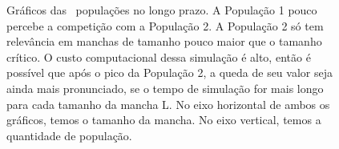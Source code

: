 \documentclass{article}
\begin{document}
	\begin{figure}[h]
		\centering
		\qquad
		\caption{Gráficos das ~populações no longo prazo. A População 1 pouco percebe a competição com a População 2. A População 2 só tem relevância em manchas de tamanho pouco maior que o tamanho crítico. O custo computacional dessa simulação é alto, então é possível que após o pico da População 2, a queda de seu valor seja ainda mais pronunciado, se o tempo de simulação for mais longo para cada tamanho da mancha L. No eixo horizontal de ambos os gráficos, temos o tamanho da mancha. No eixo vertical, temos a quantidade de população.}
		\label{fig:Two-P-21-Population-Competition-Time}
	\end{figure}	
\end{document}
